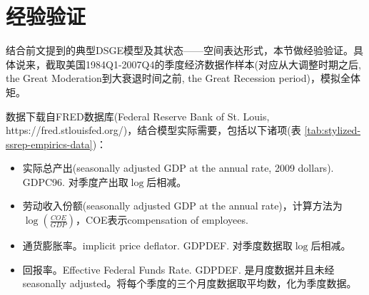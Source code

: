 \section{经验验证}
\label{sec:stylized-empirics}
结合前文提到的典型DSGE模型及其状态——空间表达形式，本节做经验验证。具体说来，截取美国1984Q1-2007Q4的季度经济数据作样本(对应从大调整时期之后, the Great Moderation到大衰退时间之前, the Great Recession period)，模拟全体矩。


数据下载自FRED数据库(Federal Reserve Bank of St. Louis, https://fred.stlouisfed.org/)，结合模型实际需要，包括以下诸项(表  \ref{tab:stylized-ssrep-empirics-data})：
\begin{itemize}
  \item 实际总产出(seasonally adjusted GDP at the annual rate, 2009 dollars). GDPC96.
  对季度产出取$\log$后相减。
  \item 劳动收入份额(seasonally adjusted GDP at the annual rate)，计算方法为$\log \left(\frac{COE}{GDP}\right)$，COE表示compensation of employees.
  \item 通货膨胀率。implicit price deflator. GDPDEF. 对季度数据取$\log$后相减。
  \item 回报率。Effective Federal Funds Rate. GDPDEF. 是月度数据并且未经seasonally adjusted。将每个季度的三个月度数据取平均数，化为季度数据。
\end{itemize}


